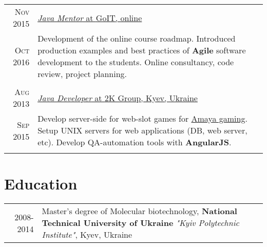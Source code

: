 \documentclass[a4paper,10pt]{article} %
\begin{document}
\begin{tabular}{r|p{11cm}}
\textsc{Nov 2015}	&	\underline{\emph{Java Mentor} at \href{http://goit.ua/}{GoIT}, online} \\
\textsc{Oct 2016}	& 	\small{
						Development of the online course roadmap.
						Introduced production examples and best practices of \textbf{Agile} software development to the students. 
						Online consultancy, code review, project planning.
					}\\
\multicolumn{2}{c}{} \\


\textsc{Aug 2013}	&	\underline{\emph{Java Developer} at \href{http://www.2kgroup.com/}{2K Group}, Kyev, Ukraine} \\
\textsc{Sep 2015}	&	\small{
						Develop server-side for web-slot games for \href{https://www.vegasslotsonline.com/amaya/}{Amaya gaming}.
						Setup UNIX servers for web applications (DB, web server, etc).
						Develop QA-automation tools with \textbf{AngularJS}.
					}\\
\multicolumn{2}{c}{} \\
\end{tabular}



\section{Education}

\begin{tabular}{r|p{10cm}}
\textsc{2008-2014} & Master’s degree of Molecular biotechnology, \textbf{National Technical University of Ukraine} 
\textit{"Kyiv Polytechnic Institute"}, Kyev, Ukraine \\


\end{tabular}
\end{document}

